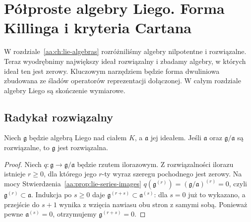 \chapter[Półproste algebry Liego]{Półproste algebry Liego. Forma Killinga i kryteria Cartana}
\label{aa:ch:semisimple-lie}

W rozdziale~\ref{aa:ch:lie-algebras} rozróżniliśmy
algebry nilpotentne i rozwiązalne. Teraz wyodrębnimy
największy ideał rozwiązalny i zbadamy algebry,
w których ideał ten jest zerowy. Kluczowym narzędziem
będzie forma dwuliniowa zbudowana ze śladów operatorów
reprezentacji dołączonej. W całym rozdziale algebry
Liego są skończenie wymiarowe.

\section{Radykał rozwiązalny}

\begin{lemat}
\label{aa:lem:lie-solvable-extension}
Niech $\mathfrak g$ będzie algebrą Liego nad ciałem $K$,
a $\mathfrak a$ jej ideałem. Jeśli $\mathfrak a$ oraz
$\mathfrak g/\mathfrak a$ są rozwiązalne, to
$\mathfrak g$ jest rozwiązalna.
\end{lemat}
\begin{proof}
Niech $q:\mathfrak g\to\mathfrak g/\mathfrak a$
będzie rzutem ilorazowym. Z rozwiązalności ilorazu
istnieje $r\ge0$, dla którego jego $r$-ty wyraz
szeregu pochodnego jest zerowy. Na mocy
Stwierdzenia~\ref{aa:prop:lie-series-images}
$q(\mathfrak g^{(r)})=(\mathfrak g/\mathfrak a)^{(r)}=0$,
czyli $\mathfrak g^{(r)}\subset\mathfrak a$.
Indukcja po $s\ge0$ daje
$\mathfrak g^{(r+s)}\subset\mathfrak a^{(s)}$:
dla $s=0$ już to wykazano, a przejście do $s+1$
wynika z wzięcia nawiasu obu stron z samymi sobą.
Ponieważ pewne $\mathfrak a^{(s)}=0$, otrzymujemy
$\mathfrak g^{(r+s)}=0$.
\end{proof}

